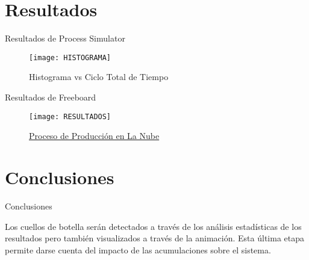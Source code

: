 \documentclass[11pt]{beamer}					%
\begin{document}
\section{Resultados}	 
		\begin{frame}
    		\begin{block}{Resultados de Process Simulator}
				\begin{center}
				\begin{figure}[htb]
	\texttt{[image: HISTOGRAMA]}
	\caption{Histograma vs Ciclo Total de Tiempo}
	\label{fig:HISTOGRAMA}
				\end{figure}
				\end{center}
	   		\end{block}
	 	\end{frame}
		\begin{frame}
    		\begin{block}{Resultados de Freeboard}
				\begin{center}
				\begin{figure}[htb]
		\texttt{[image: RESULTADOS]}   
	\caption{ \href{https://freeboard.io/board/U-EO0n}{Proceso de Producción en La Nube}} \label{fig:RESULTADOS}
				\end{figure}
				\end{center}
	   		\end{block}
	 	\end{frame}

\section{Conclusiones}	 
		\begin{frame}
    		\begin{block}{Conclusiones}
				\begin{center}
					Los cuellos de botella serán detectados a través de los análisis estadísticas de los resultados pero también visualizados a través de la animación. Esta última etapa permite darse cuenta del impacto de las acumulaciones sobre el sistema.
				\end{center}
	   		\end{block}
	 	\end{frame}
		
		
\end{document}
